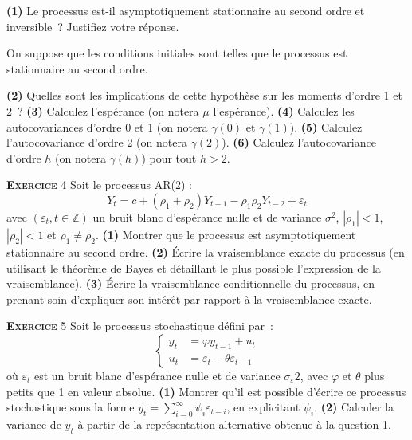 \documentclass[10pt,a4paper,notitlepage,twocolumn]{article}
\newcommand{\exercice}[1]{\textsc{\textbf{Exercice}} #1}
\newcommand{\question}[1]{\textbf{(#1)}}
\begin{document}
\question{1} Le processus est-il asymptotiquement stationnaire au second ordre
et inversible~? Justifiez votre réponse.\newline

On suppose  que les conditions initiales sont telles que le
processus est stationnaire au second ordre.\newline

\question{2} Quelles sont les implications de cette hypothèse sur les
moments d'ordre 1 et 2~? \question{3} Calculez l'espérance (on notera
$\mu$ l'espérance). \question{4} Calculez les autocovariances d'ordre
0 et 1 (on notera $\gamma(0)$ et $\gamma(1)$). \question{5} Calculez
l'autocovariance d'ordre 2 (on notera $\gamma(2)$). \question{6}
Calculez l'autocovariance d'ordre $h$ (on notera $\gamma(h)$) pour tout
$h>2$.\newline

\bigskip

\exercice{4} Soit le processus AR(2) :
\[
Y_t = c + (\rho_1+\rho_2)Y_{t-1} - \rho_1\rho_2 Y_{t-2} + \varepsilon_t
\]
avec $(\varepsilon_t, t\in\mathbb Z)$ un bruit blanc d'espérance nulle et de
variance $\sigma^2$, $|\rho_1|<1$, $|\rho_2|<1$ et $\rho_1\neq\rho_2$.
\question{1} Montrer que le processus est asymptotiquement stationnaire au
second ordre. \question{2} Écrire la vraisemblance exacte du processus (en
utilisant le théorème de Bayes et détaillant le plus possible l'expression de la
vraisemblance). \question{3} Écrire la vraisemblance conditionnelle du
processus, en prenant soin d'expliquer son intérêt par rapport à la
vraisemblance exacte.\newline

\bigskip

\exercice{5} Soit le processus stochastique défini par~:
\[
  \begin{cases}
    y_t &= \varphi y_{t-1} + u_t\\
    u_t &= \varepsilon_t - \theta \varepsilon_{t-1}
  \end{cases}
\]
où $\varepsilon_t$ est un bruit blanc d'espérance nulle et de variance
$\sigma_{\varepsilon}2$, avec $\varphi$ et $\theta$ plus petits que 1 en valeur
absolue. \question{1} Montrer qu'il est possible d'écrire ce processus
stochastique sous la forme $y_t = \sum_{i=0}^{\infty}\psi_i\varepsilon_{t-i}$,
en explicitant $\psi_i$. \question{2} Calculer la variance de $y_t$ à partir de
la représentation alternative obtenue à la question 1.
\end{document}
